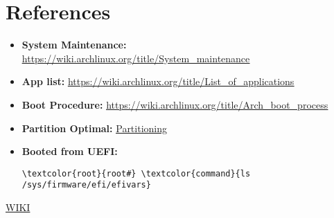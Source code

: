 \documentclass[10pt, a4paper, onecolumn, openany]{book} %
\begin{document}
\chapter{References}
\begin{itemize}
    \item \textbf{System Maintenance:}
\newline \underline{\href{https://wiki.archlinux.org/title/System\_maintenance}{https://wiki.archlinux.org/title/System\_maintenance}}
    \item \textbf{App list:}
\newline \underline{\href{https://wiki.archlinux.org/title/List\_of\_applications}{https://wiki.archlinux.org/title/List\_of\_applications}}

    \item \textbf{Boot Procedure:}
\newline \underline{\href{https://wiki.archlinux.org/title/Arch\_boot\_process}{https://wiki.archlinux.org/title/Arch\_boot\_process}}
    \item \textbf{Partition Optimal:}
\newline \underline{\href{https://rainbow.chard.org/2013/01/30/how-to-align-partitions-for-best-performance-using-parted/}{Partitioning}}
    \item \textbf{Booted from UEFI:}
\begin{Verbatim}[commandchars=\\\{\}]
\textcolor{root}{root#} \textcolor{command}{ls /sys/firmware/efi/efivars}
\end{Verbatim}
\end{itemize}
\href{https://wiki.archlinux.org/title/General_recommendations}{WIKI}
\end{document}
